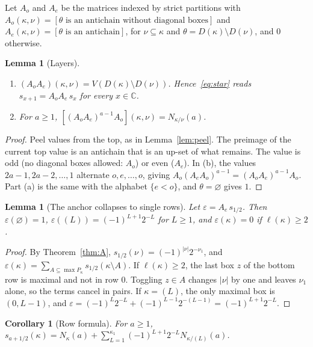 \documentclass[11pt]{amsart}
\newtheorem{lemma}[theorem]{Lemma}
\newtheorem{corollary}[theorem]{Corollary}
\theoremstyle{definition}
\theoremstyle{remark}
\newcommand{\C}{\mathbb{C}}
\begin{document}
Let $A_o$ and $A_e$ be the matrices indexed by strict partitions with
$A_o(\kappa,\nu)=[\theta\text{ is an antichain without diagonal boxes}]$ and
$A_e(\kappa,\nu)=[\theta\text{ is an antichain}]$, for $\nu\subseteq\kappa$ and
$\theta=D(\kappa)\setminus D(\nu)$, and $0$ otherwise.

\begin{lemma}[Layers]\label{lem:layers}
\begin{enumerate}[label=(\alph*)]
\item $(A_oA_e)(\kappa,\nu)=V(D(\kappa)\setminus D(\nu))$. Hence~\eqref{eq:star} reads
$s_{x+1}=A_oA_e\,s_x$ for every $x\in\C$.
\item For $a\ge1$, $[(A_oA_e)^{a-1}A_o](\kappa,\nu)=N_{\kappa/\nu}(a)$.
\end{enumerate}
\end{lemma}

\begin{proof}
Peel values from the top, as in Lemma~\ref{lem:peel}. The preimage of the current top value is
an antichain that is an up-set of what remains. The value is odd (no diagonal boxes allowed:
$A_o$) or even ($A_e$). In (b), the values $2a-1,2a-2,\dots,1$ alternate $o,e,\dots,o$, giving
$A_o(A_eA_o)^{a-1}=(A_oA_e)^{a-1}A_o$. Part (a) is the same with the alphabet $\{e<o\}$, and
$\theta=\varnothing$ gives $1$.
\end{proof}

\begin{lemma}[The anchor collapses to single rows]\label{lem:eps}
Let $\varepsilon=A_e\,s_{1/2}$. Then $\varepsilon(\varnothing)=1$,
$\varepsilon((L))=(-1)^{L+1}2^{-L}$ for $L\ge1$, and $\varepsilon(\kappa)=0$ if
$\ell(\kappa)\ge2$.
\end{lemma}

\begin{proof}
By Theorem~\ref{thm:A}, $s_{1/2}(\nu)=(-1)^{|\nu|}2^{-\nu_1}$, and
$\varepsilon(\kappa)=\sum_{A\subseteq\max P_\kappa}s_{1/2}(\kappa\setminus A)$. If
$\ell(\kappa)\ge2$, the last box $z$ of the bottom row is maximal and not in row $0$. Toggling
$z\in A$ changes $|\nu|$ by one and leaves $\nu_1$ alone, so the terms cancel in pairs. If
$\kappa=(L)$, the only maximal box is $(0,L-1)$, and
$\varepsilon=(-1)^L2^{-L}+(-1)^{L-1}2^{-(L-1)}=(-1)^{L+1}2^{-L}$.
\end{proof}

\begin{corollary}[Row formula]\label{cor:row}
For $a\ge1$, $s_{a+1/2}(\kappa)=N_\kappa(a)+\sum_{L=1}^{\kappa_1}(-1)^{L+1}2^{-L}N_{\kappa/(L)}(a)$.
\end{corollary}
\end{document}
